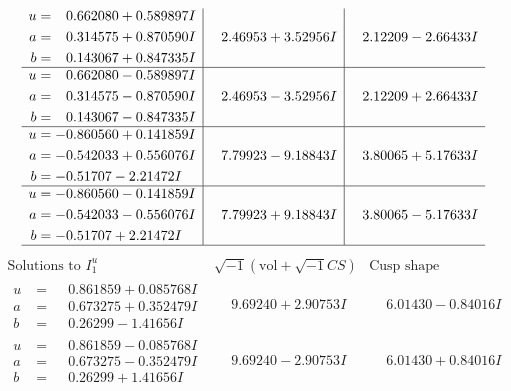 \documentclass[1p]{elsarticle_modified}
\theoremstyle{definition}
\newcommand{\I}{\sqrt{-1}}
\begin{document}
$$\begin{array}{c|c|c}
\begin{aligned}
u &= \phantom{-}0.662080 + 0.589897 I \\
a &= \phantom{-}0.314575 + 0.870590 I \\
b &= \phantom{-}0.143067 + 0.847335 I\end{aligned}
 & \phantom{-}2.46953 + 3.52956 I & \phantom{-}2.12209 - 2.66433 I \\ \hline\begin{aligned}
u &= \phantom{-}0.662080 - 0.589897 I \\
a &= \phantom{-}0.314575 - 0.870590 I \\
b &= \phantom{-}0.143067 - 0.847335 I\end{aligned}
 & \phantom{-}2.46953 - 3.52956 I & \phantom{-}2.12209 + 2.66433 I \\ \hline\begin{aligned}
u &= -0.860560 + 0.141859 I \\
a &= -0.542033 + 0.556076 I \\
b &= -0.51707 - 2.21472 I\end{aligned}
 & \phantom{-}7.79923 - 9.18843 I & \phantom{-}3.80065 + 5.17633 I \\ \hline\begin{aligned}
u &= -0.860560 - 0.141859 I \\
a &= -0.542033 - 0.556076 I \\
b &= -0.51707 + 2.21472 I\end{aligned}
 & \phantom{-}7.79923 + 9.18843 I & \phantom{-}3.80065 - 5.17633 I\\
 \hline 
 \end{array}$$\newpage$$\begin{array}{c|c|c}  
\text{Solutions to }I^u_{1}& \I (\text{vol} + \sqrt{-1}CS) & \text{Cusp shape}\\
 \hline 
\begin{aligned}
u &= \phantom{-}0.861859 + 0.085768 I \\
a &= \phantom{-}0.673275 + 0.352479 I \\
b &= \phantom{-}0.26299 - 1.41656 I\end{aligned}
 & \phantom{-}9.69240 + 2.90753 I & \phantom{-}6.01430 - 0.84016 I \\ \hline\begin{aligned}
u &= \phantom{-}0.861859 - 0.085768 I \\
a &= \phantom{-}0.673275 - 0.352479 I \\
b &= \phantom{-}0.26299 + 1.41656 I\end{aligned}
 & \phantom{-}9.69240 - 2.90753 I & \phantom{-}6.01430 + 0.84016 I \\ \hline\begin{aligned}

\end{aligned}
\end{array}$$
\end{document}
